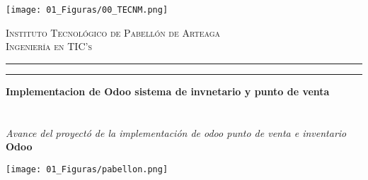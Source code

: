 \documentclass[12pt]{report}
\begin{document}
\begin{titlepage}
\begin{minipage}[c]{0.15\textwidth}
  \centering
  \texttt{[image: 01\_Figuras/00\_TECNM.png]}
\end{minipage}
\hfill %
\begin{minipage}[c]{0.8\textwidth}
    \centering
        \textsc{\large Instituto Tecnológico de Pabellón de Arteaga}\\[0.3cm]
        \textsc{\large Ingeniería en TIC's}\\[0.3cm]
        \hrule height1pt
        \vspace{0.1cm}
        \hrule height2pt
        \vspace{0.3cm}
\end{minipage}

\begin{minipage}[c]{0.15\textwidth}
    \vspace{0.5cm}
    \hspace{0.5cm}
    \vrule width1pt height15cm 
    \hspace{0.05cm}
    \vrule width2pt height15cm
\end{minipage}
\hfill %
\begin{minipage}[c]{0.8\textwidth}
    \centering
        \textbf{\large Implementacion de Odoo sistema de invnetario y punto de venta}\\[1cm]
        \\[1cm]
        \\[1cm]
        \textit{\large Avance del proyectó de la implementación de odoo punto de venta e inventario}\\[1cm]
        \textbf{\Large Odoo}\\[1cm]
\end{minipage}
\begin{minipage}[c]{0.20\textwidth}
  \centering
  \texttt{[image: 01\_Figuras/pabellon.png]}
\end{minipage}
\hfill %
\begin{minipage}[c]{0.8\textwidth}
    \centering
\end{minipage}

\end{titlepage}
\end{document}
